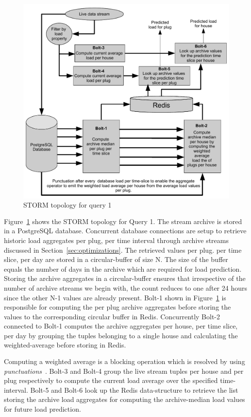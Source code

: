 \documentclass{sig-alternate}
\begin{document}
\begin{figure}[!htbp]
\includegraphics[scale=0.42]{query1.pdf}
\caption{STORM topology for query 1}
\label{fig:q1-topo}
\end{figure}

Figure~\ref{fig:q1-topo} shows the STORM topology for Query 1. The stream archive is stored in a PostgreSQL database. Concurrent database connections are setup to retrieve historic load aggregates per plug, per time interval through archive streams discussed in Section~\ref{sec:optimizations}. The retrieved values per plug. per time slice, per day are stored in a circular-buffer of size N. The size of the  buffer equals the  number of days in the archive which are required for load prediction. Storing the archive aggregates in a circular-buffer ensures that irrespective of the number of archive streams we begin with, the count reduces to one after 24 hours since the other N-1 values are already present. Bolt-1 shown in Figure~\ref{fig:q1-topo} is responsible for computing the per plug archive aggregates before storing the values to the corresponding circular buffer in Redis. Concurrently  Bolt-2 connected to  Bolt-1 computes the archive aggregates per house, per time slice, per day by grouping the tuples belonging to a single house and calculating the weighted-average before storing in Redis.

 Computing a weighted average is a blocking operation which is resolved by using {\it punctuations}~\cite{tucker2003exploiting}. Bolt-3 and Bolt-4 group the live stream tuples per house and per plug respectively to compute the current load average over the specified time-interval. Bolt-5 and Bolt-6 look up the Redis data-structure to retrieve the list storing the archive load aggregates for computing the archive-median load values for future load prediction.
\end{document}
